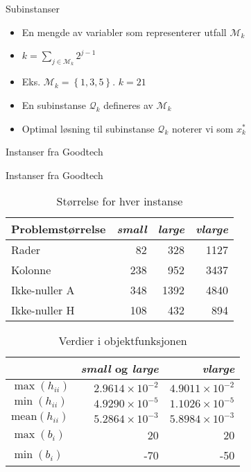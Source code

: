 \documentclass{beamer}
\begin{document}
\begin{frame}{Subinstanser}
\begin{itemize}
\item En mengde av variabler som representerer utfall $\mathcal{M}_k$
\item $k = \sum_{j \in \mathcal{M}_k}^{} 2^{j-1}$
\item Eks. $\mathcal{M}_k = \left\{1,3,5 \right\}$. $k = 21$
\item En subinstanse $\mathcal{Q}_k$ defineres av $\mathcal{M}_k$
\item Optimal løsning til subinstanse $\mathcal{Q}_k$ noterer vi som $x_k^*$
\end{itemize}
\end{frame}



\begin{frame}{Instanser fra Goodtech}

\end{frame}



\begin{frame}{Instanser fra Goodtech}
\begin{table}[ht!]
    \centering
    \caption{Størrelse for hver instanse}
    \begin{tabular}{lrrr}
    Problemstørrelse & \textit{small} & \textit{large} & \textit{vlarge} \\\hline
    Rader        & 82             & 328            & 1127 \\
    Kolonne      & 238            & 952            & 3437 \\
    Ikke-nuller A & 348            & 1392           & 4840 \\
    Ikke-nuller H & 108            & 432            & 894 \\
    \end{tabular}
    \label{table:sizes}
\end{table}
\begin{table}[ht!]
    \centering
    \caption{Verdier i objektfunksjonen}

    \begin{tabular}{lrr}
      & \textit{small} og \textit{large}         & \textit{vlarge} \\\hline
    $\max(h_{ii})$      & $2.9614 \times 10^{-2}$ & $4.9011 \times 10^{-2}$ \\
    $\min(h_{ii})$      & $4.9290 \times 10^{-5}$ & $1.1026 \times 10^{-5}$ \\
$\textrm{mean}(h_{ii})$ & $5.2864 \times 10^{-3}$ & $5.8984 \times 10^{-3}$ \\
    $\max(b_{i})$       & 20                      & 20 \\
    $\min(b_{i})$       & -70                     & -50 \\
    \end{tabular}
    \label{table:maxmin}
\end{table}
\end{frame}
\end{document}
